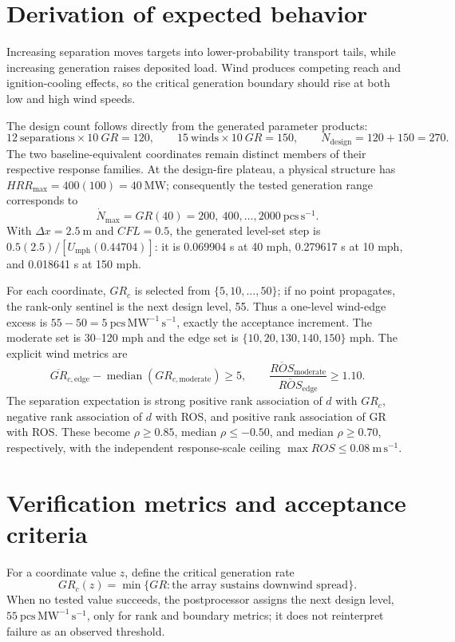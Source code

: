\section{Derivation of expected behavior}
Increasing separation moves targets into lower-probability transport tails, while increasing generation raises deposited load. Wind produces competing reach and ignition-cooling effects, so the critical generation boundary should rise at both low and high wind speeds.

The design count follows directly from the generated parameter products:
\[
 12\ \text{separations}\times10\ GR=120,\qquad
 15\ \text{winds}\times10\ GR=150,\qquad
 N_{\mathrm{design}}=120+150=270.
\]
The two baseline-equivalent coordinates remain distinct members of their
respective response families.  At the design-fire plateau, a physical
structure has \(HRR_{\max}=400(100)=40~\mathrm{MW}\); consequently the tested
generation range corresponds to
\[
 \dot N_{\max}=GR(40)=200,\ 400,\ldots,2000~\mathrm{pcs\,s^{-1}}.
\]
With \(\Delta x=2.5~\mathrm{m}\) and \(CFL=0.5\), the generated level-set
step is \(0.5(2.5)/[U_{\mathrm{mph}}(0.44704)]\): it is
0.069904 s at 40 mph, 0.279617 s at 10 mph, and 0.018641 s at 150 mph.

For each coordinate, \(GR_c\) is selected from
\(\{5,10,\ldots,50\}\); if no point propagates, the rank-only sentinel is the
next design level, 55.  Thus a one-level wind-edge excess is
\(55-50=5~\mathrm{pcs\,MW^{-1}\,s^{-1}}\), exactly the acceptance
increment.  The moderate set is 30--120 mph and the edge set is
\(\{10,20,130,140,150\}\) mph.  The explicit wind metrics are
\[
 \overline{GR}_{c,\mathrm{edge}}
 -\operatorname{median}(GR_{c,\mathrm{moderate}})\geq5,\qquad
 \frac{\overline{ROS}_{\mathrm{moderate}}}
      {\overline{ROS}_{\mathrm{edge}}}\geq1.10.
\]
The separation expectation is strong positive rank association of \(d\) with
\(GR_c\), negative rank association of \(d\) with ROS, and positive rank
association of GR with ROS.  These become
\(\rho\geq0.85\), median \(\rho\leq-0.50\), and median
\(\rho\geq0.70\), respectively, with the independent response-scale ceiling
\(\max ROS\leq0.08~\mathrm{m\,s^{-1}}\).

\section{Verification metrics and acceptance criteria}

For a coordinate value \(z\), define the critical generation rate
\[
 GR_{c}(z)=\min\{GR:\text{the array sustains downwind spread}\}.
\]
When no tested value succeeds, the postprocessor assigns the next design
level, \(55\ \mathrm{pcs\,MW^{-1}\,s^{-1}}\), only for rank and boundary
metrics; it does not reinterpret failure as an observed threshold.

